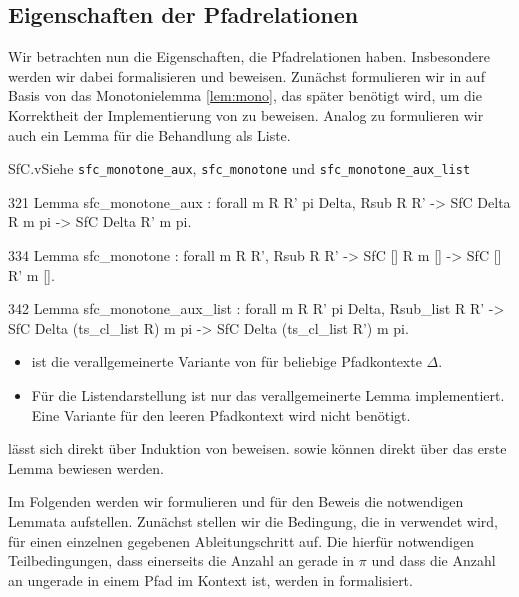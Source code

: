 \subsection{Eigenschaften der Pfadrelationen}

Wir betrachten nun die Eigenschaften, die Pfadrelationen haben. Insbesondere werden wir dabei  formalisieren und beweisen. Zunächst formulieren wir in  auf Basis von  das Monotonielemma \ref{lem:mono}, das später benötigt wird, um die Korrektheit der Implementierung von  zu beweisen. Analog zu  formulieren wir auch ein Lemma für die Behandlung als Liste.

\begin{multicode}{SfC.v}{Siehe }{\texttt{sfc\_monotone\_aux}, \texttt{sfc\_monotone} und \texttt{sfc\_monotone\_aux\_list}}
    \begin{mcode}{321}
Lemma sfc_monotone_aux : forall m R R' pi Delta, Rsub R R' ->
    SfC Delta R m pi -> SfC Delta R' m pi.
    \end{mcode}
    \begin{mcode}{334}
Lemma sfc_monotone : forall m R R', Rsub R R' -> 
    SfC [] R m [] -> SfC [] R' m [].
    \end{mcode}
    \begin{mcode}{342}
Lemma sfc_monotone_aux_list : forall m R R' pi Delta, Rsub_list R R' ->
    SfC Delta (ts_cl_list R) m pi ->
      SfC Delta (ts_cl_list R') m pi.
    \end{mcode}
\end{multicode}
\begin{remark}
    \begin{itemize}
        \item {} ist die verallgemeinerte Variante von  für beliebige Pfadkontexte $\Delta$. 
        \item  Für die Listendarstellung ist nur das verallgemeinerte Lemma implementiert. Eine Variante für den leeren Pfadkontext wird nicht benötigt.
    \end{itemize}
\end{remark}    
 lässt sich direkt über Induktion von  beweisen.  sowie  können direkt über das erste Lemma bewiesen werden.

Im Folgenden werden wir  formulieren und für den Beweis die notwendigen Lemmata aufstellen. Zunächst stellen wir die Bedingung, die in  verwendet wird, für einen einzelnen gegebenen Ableitungschritt auf. Die hierfür notwendigen Teilbedingungen, dass einerseits die Anzahl an \src{} gerade in $\pi$ und dass die Anzahl an \src{} ungerade in einem Pfad im Kontext ist, werden in  formalisiert.

